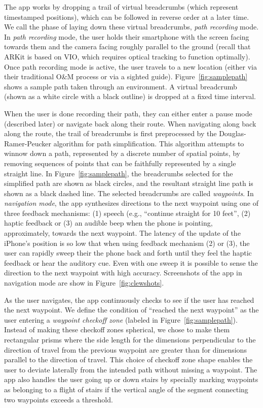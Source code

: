 \documentclass[chi_draft]{sigchi}
\newcommand{\OM}{O\&M\xspace}
\begin{document}
The app works by dropping a trail of virtual breadcrumbs (which represent timestamped positions), which can be followed in reverse order at a later time.  We call the phase of laying down these virtual breadcrumbs, \emph{path recording} mode.  In \emph{path recording} mode, the user holds their smartphone with the screen facing towards them and the camera facing roughly parallel to the ground (recall that ARKit is based on VIO, which requires optical tracking to function optimally).  Once path recording mode is active, the user travels to a new location (either via their traditional \OM process or via a sighted guide).  Figure~\ref{fig:samplepath} shows a sample path taken through an environment.  A virtual breadcrumb (shown as a white circle with a black outline) is dropped at a fixed time interval.

When the user is done recording their path, they can either enter a pause mode (described later) or navigate back along their route.  When navigating along back along the route, the trail of breadcrumbs is first preprocessed by the Douglas-Ramer-Peucker algorithm \cite{douglas1973algorithms} for path simplification.  This algorithm attempts to winnow down a path, represented by a discrete number of spatial points, by removing sequences of points that can be faithfully represented by a single straight line.  In Figure~\ref{fig:samplepath}, the breadcrumbs selected for the simplified path are shown as black circles, and the resultant  straight line path is shown as a black dashed line.  The selected breadcrumbs are called \emph{waypoints}.  In \emph{navigation mode}, the app synthesizes directions to the next waypoint using one of three feedback mechanisms: (1) speech (e.g., ``continue straight for 10 feet'', (2) haptic feedback or (3) an audible beep when the phone is pointing, approximately, towards the next waypoint.  The latency of the update of the iPhone's position is so low that when using feedback mechanism (2) or (3), the user can rapidly sweep their the phone back and forth until they feel the haptic feedback or hear the auditory cue.  Even with one sweep it is possible to sense the direction to the next waypoint with high accuracy.  Screenshots of the app in navigation mode are show in Figure~\ref{fig:clewshots}.

As the user navigates, the app continuously checks to see if the user has reached the next waypoint.  We define the condition of ``reached the next waypoint'' as the user entering a \emph{waypoint checkoff zone} (labeled in Figure~\ref{fig:samplepath}).  Instead of making these checkoff zones spherical, we chose to make them rectangular prisms where the side length for the dimensions perpendicular to the direction of travel from the previous waypoint are greater than for dimensions parallel to the direction of travel.  This choice of checkoff zone shape enables the user to deviate laterally from the intended path without missing a waypoint.  The app also handles the user going up or down stairs by specially marking waypoints as belonging to a flight of stairs if the vertical angle of the segment connecting two waypoints exceeds a threshold.
\end{document}
